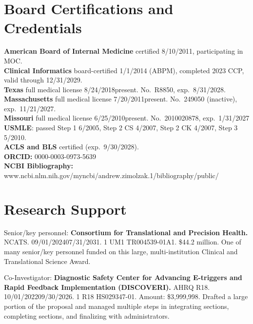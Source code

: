 \documentclass[10pt]{article}
\begin{document}
\section{Board Certifications and Credentials}  %

\textbf{American Board of Internal Medicine} certified 8/10/2011,
participating in MOC.\\
\textbf{Clinical Informatics} board-certified 1/1/2014 (ABPM),
completed 2023 CCP, valid through 12/31/2029.\\  %
\textbf{Texas} full medical license 8/24/2018\ndash{}present.
No.\ R8850, exp.\ 8/31/2028.\\
\textbf{Massachusetts} full medical license 7/20/2011\ndash{}present.
No.\ 249050 (inactive), exp.\ 11/21/2027.\\
\textbf{Missouri} full medical license 6/25/2010\ndash{}present.
No.\ 2010020878, exp.\ 1/31/2027\\
\textbf{USMLE}: passed Step 1 6/2005, Step 2 CS 4/2007, Step 2 CK
4/2007, Step 3 5/2010.\\
\textbf{ACLS and BLS} certified (exp.\ 9/30/2028).\\
\textbf{ORCID:} 0000-0003-0973-5639\\
\textbf{NCBI Bibliography:} www.ncbi.nlm.nih.gov/myncbi/andrew.zimolzak.1/bibliography/public/


\section{Research Support}  %



Senior/key personnel: \textbf{Consortium for Translational and
  Precision Health.} NCATS. 09/01/2024\ndash{}07/31/2031. 1 UM1
TR004539-01A1. \$44.2 million. One of many senior/key personnel funded
on this large, multi-institution Clinical and Translational Science
Award.

Co-Investigator: \textbf{Diagnostic Safety Center for Advancing
  E-triggers and Rapid Feedback Implementation (DISCOVERI).} AHRQ R18.
10/01/2022\ndash{}09/30/2026. 1 R18 HS029347-01. Amount: \$3,999,998.
Drafted a large portion of the proposal and managed multiple steps in
integrating sections, completing sections, and finalizing with
administrators.
\end{document}
